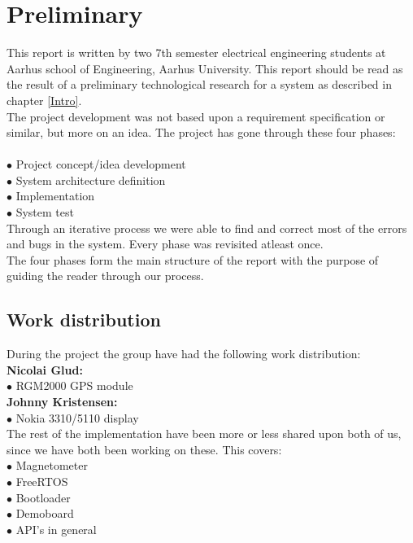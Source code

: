 \chapter{Preliminary}

This report is written by two 7th semester electrical engineering students at Aarhus school of Engineering, Aarhus University. This report should be read as the result of a preliminary technological research for a system as described in chapter \ref{Intro}.\\
The project development was not based upon a requirement specification or similar, but more on an idea. The project has gone through these four phases:\\
\\
$\bullet$ Project concept/idea development\\
$\bullet$ System architecture definition\\
$\bullet$ Implementation\\
$\bullet$ System test\\

Through an iterative process we were able to find and correct most of the errors and bugs in the system. Every phase was revisited atleast once. \\
The four phases form the main structure of the report with the purpose of guiding the reader through our process.\\

\section{Work distribution}
During the project the group have had the following work distribution:\\
\textbf{Nicolai Glud:}\\
$\bullet$\hspace*{.2cm} RGM2000 GPS module\\
\textbf{Johnny Kristensen:}\\
$\bullet$\hspace*{.2cm} Nokia 3310/5110 display\\
The rest of the implementation have been more or less shared upon both of us, since we have both been working on these. This covers:\\
$\bullet$\hspace*{.2cm} Magnetometer\\
$\bullet$\hspace*{.2cm} FreeRTOS\\
$\bullet$\hspace*{.2cm} Bootloader\\
$\bullet$\hspace*{.2cm} Demoboard\\
$\bullet$\hspace*{.2cm} API's in general